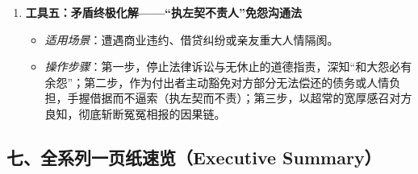 \begin{enumerate}
    \item \textbf{工具五：矛盾终极化解——“执左契不责人”免怨沟通法}
    \begin{itemize}
        \item \emph{适用场景}：遭遇商业违约、借贷纠纷或亲友重大人情隔阂。
        \item \emph{操作步骤}：第一步，停止法律诉讼与无休止的道德指责，深知“和大怨必有余怨”；第二步，作为付出者主动豁免对方部分无法偿还的债务或人情负担，手握借据而不逼索（执左契而不责）；第三步，以超常的宽厚感召对方良知，彻底斩断冤冤相报的因果链。
    \end{itemize}
\end{enumerate}

\clearpage

\subsection*{七、全系列一页纸速览（Executive Summary）}

